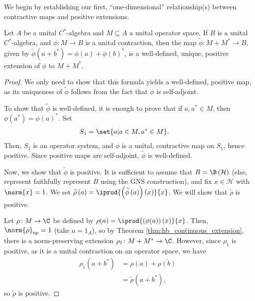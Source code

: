 We begin by establishing our first, ``one-dimensional'' relationship(s) between contractive maps and positive extensions.
\begin{proposition}\label{prop:extension_of_contractions}
  Let $A$ be a unital $C^{\ast}$-algebra and $M\subseteq A$ a unital operator space. If $B$ is a unital $C^{\ast}$-algebra, and $\phi\colon M\rightarrow B$ is a unital contraction, then the map $\widetilde{\phi}\colon M + M^{\ast}\rightarrow B$, given by $\widetilde{\phi}\left( a + b^{\ast} \right) = \phi\left( a \right) + \phi\left( b \right)^{\ast}$, is a well-defined, unique, positive extension of $\phi$ to $M + M^{\ast}$.
\end{proposition}
\begin{proof}
  We only need to show that this formula yields a well-defined, positive map, as its uniqueness of $\widetilde{\phi}$ follows from the fact that $\phi$ is self-adjoint.\newline

  To show that $\widetilde{\phi}$ is well-defined, it is enough to prove that if $a,a^{\ast}\in M$, then $\phi\left( a^{\ast} \right) = \phi\left( a \right)^{\ast}$. Set
  \begin{align*}
    S_1 &= \set{a | a\in M,a^{\ast}\in M}.
  \end{align*}
  Then, $S_1$ is an operator system, and $\phi$ is a unital, contractive map on $S_1$, hence positive. Since positive maps are self-adjoint, $\widetilde{\phi}$ is well-defined.\newline

  Now, we show that $\widetilde{\phi}$ is positive. It is sufficient to assume that $B = \B\left( \mathcal{H} \right)$ (else, represent faithfully represent $B$ using the GNS construction), and fix $x\in \mathcal{H}$ with $\norm{x} = 1$. We set $\widetilde{\rho}\left( a \right) = \iprod{\left( \widetilde{\phi}\left( a \right) \right)(x)}{x}$. We will show that $\widetilde{\rho}$ is positive.\newline

  Let $\rho\colon M\rightarrow \C$ be defined by $\rho(a) = \iprod{\left( \phi(a) \right)(x)}{x}$. Then, $\norm{\rho}_{\op} = 1$ (take $a = 1_A$), so by Theorem \ref{thm:hb_continuous_extension}, there is a norm-preserving extension $\rho_1\colon M + M^{\ast}\rightarrow \C$. However, since $\rho_1$ is positive, as it is a unital contraction on an operator space, we have
  \begin{align*}
    \rho_1\left( a + b^{\ast} \right) &= \rho\left( a \right) + \overline{\rho\left( b \right)}\\
                                      &= \widetilde{\rho}\left( a + b^{\ast} \right),
  \end{align*}
  so $\widetilde{\rho}$ is positive.
\end{proof}
